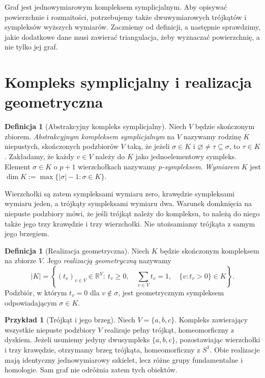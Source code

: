 \documentclass[11pt,a4paper]{report}
\numberwithin{equation}{section}
\theoremstyle{plain}
\theoremstyle{definition}
\newtheorem{definicja}[twierdzenie]{Definicja}
\newtheorem{przyklad}[twierdzenie]{Przykład}
\theoremstyle{remark}
\begin{document}
Graf jest jednowymiarowym kompleksem symplicjalnym. Aby opisywać
powierzchnie i rozmaitości, potrzebujemy także dwuwymiarowych
trójkątów i sympleksów wyższych wymiarów. Zaczniemy od definicji,
a następnie sprawdzimy, jakie dodatkowe dane musi zawierać
triangulacja, żeby wyznaczać powierzchnię, a nie tylko jej graf.

\section{Kompleks symplicjalny i realizacja geometryczna}
\label{sec:tg-kompleks-symplicjalny}

\begin{definicja}[Abstrakcyjny kompleks symplicjalny]
Niech $V$ będzie skończonym zbiorem. \emph{Abstrakcyjnym
kompleksem symplicjalnym} na $V$ nazywamy rodzinę $K$
niepustych, skończonych podzbiorów $V$ taką, że jeżeli
$\sigma\in K$ i $\varnothing\ne\tau\subseteq\sigma$,
to $\tau\in K$. Zakładamy, że każdy $v\in V$ należy do $K$
jako jednoelementowy sympleks. Element $\sigma\in K$
o $p+1$ wierzchołkach nazywamy \emph{$p$-sympleksem}.
\emph{Wymiarem} $K$ jest
$\dim K:=\max\{|\sigma|-1:\sigma\in K\}$.
\end{definicja}

Wierzchołki są zatem sympleksami wymiaru zero, krawędzie
sympleksami wymiaru jeden, a trójkąty sympleksami wymiaru dwa.
Warunek domknięcia na niepuste podzbiory mówi, że jeśli
trójkąt należy do kompleksu, to należą do niego także jego
trzy krawędzie i trzy wierzchołki. Nie utożsamiamy
trójkąta z samym jego brzegiem.

\begin{definicja}[Realizacja geometryczna]
Niech $K$ będzie skończonym kompleksem na zbiorze $V$.
Jego \emph{realizacją geometryczną} nazywamy
\[
|K|=\left\{(t_v)_{v\in V}\in\mathbb R^V:\
t_v\ge0,\quad\sum_{v\in V}t_v=1,\quad
\{v:t_v>0\}\in K\right\}.
\]
Podzbiór, w którym $t_v=0$ dla $v\notin\sigma$, jest
geometrycznym sympleksem odpowiadającym $\sigma\in K$.
\end{definicja}

\begin{przyklad}[Trójkąt i jego brzeg]
Niech $V=\{a,b,c\}$. Kompleks zawierający wszystkie niepuste
podzbiory $V$ realizuje pełny trójkąt, homeomorficzny z dyskiem.
Jeżeli usuniemy jedyny dwusympleks $\{a,b,c\}$, pozostawiając
wierzchołki i trzy krawędzie, otrzymamy brzeg trójkąta,
homeomorficzny z $S^1$. Obie realizacje mają identyczny
jednowymiarowy szkielet, lecz różne grupy fundamentalne
i homologie. Sam graf nie odróżnia zatem tych obiektów.
\end{przyklad}
\end{document}
